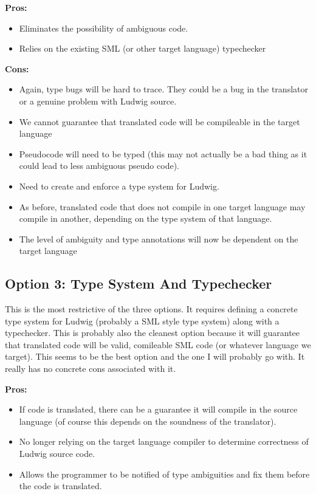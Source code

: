 \textbf{Pros:}

\begin{itemize}
\item Eliminates the possibility of ambiguous code.

\item Relies on the existing SML (or other target language) typechecker
\end{itemize}

\textbf{Cons:}

\begin{itemize}
\item Again, type bugs will be hard to trace. They could be a bug in the translator or a genuine problem with Ludwig source.

\item We cannot guarantee that translated code will be compileable in the target language

\item Pseudocode will need to be typed (this may not actually be a bad thing as it could lead to less ambiguous pseudo code).

\item Need to create and enforce a type system for Ludwig.

\item As before, translated code that does not compile in one target language may compile in another, depending on the type system of that language.

\item The level of ambiguity and type annotations will now be dependent on the target language
\end{itemize}

\subsection{Option 3: Type System And Typechecker}

This is the most restrictive of the three options. It requires defining a concrete type system for Ludwig (probably a SML style type system) along with a typechecker. This is probably also the cleanest option because it will guarantee that translated code will be valid, comileable SML code (or whatever language we target). This seems to be the best option and the one I will probably go with. It really has no concrete cons associated with it.

\textbf{Pros:}

\begin{itemize}
\item If code is translated, there can be a guarantee it will compile in the source language (of course this depends on the soundness of the translator).

\item No longer relying on the target language compiler to determine correctness of Ludwig source code.

\item Allows the programmer to be notified of type ambiguities and fix them before the code is translated.

\end{itemize}

